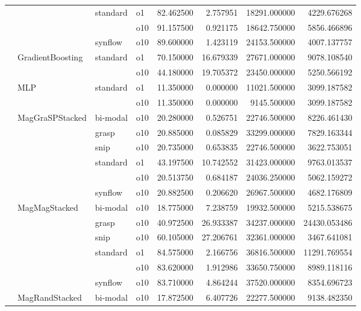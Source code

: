 \begin{longtable}{llllrrrr}
      &     & standard & o1 &  82.462500 &   2.757951 &     18291.000000 &   4229.676268 \\
      &     &         & o10 &  91.157500 &   0.921175 &     18642.750000 &   5856.466896 \\
      &     & synflow & o10 &  89.600000 &   1.423119 &     24153.500000 &   4007.137757 \\
      & GradientBoosting & standard & o1 &  70.150000 &  16.679339 &     27671.000000 &   9078.108540 \\
      &     &         & o10 &  44.180000 &  19.705372 &     23450.000000 &   5250.566192 \\
      & MLP & standard & o1 &  11.350000 &   0.000000 &     11021.500000 &   3099.187582 \\
      &     &         & o10 &  11.350000 &   0.000000 &      9145.500000 &   3099.187582 \\
      & MagGraSPStacked & bi-modal & o10 &  20.280000 &   0.526751 &     22746.500000 &   8226.461430 \\
      &     & grasp & o10 &  20.885000 &   0.085829 &     33299.000000 &   7829.163344 \\
      &     & snip & o10 &  20.735000 &   0.653835 &     22746.500000 &   3622.753051 \\
      &     & standard & o1 &  43.197500 &  10.742552 &     31423.000000 &   9763.013537 \\
      &     &         & o10 &  20.513750 &   0.684187 &     24036.250000 &   5062.159272 \\
      &     & synflow & o10 &  20.882500 &   0.206620 &     26967.500000 &   4682.176809 \\
      & MagMagStacked & bi-modal & o10 &  18.775000 &   7.238759 &     19932.500000 &   5215.538675 \\
      &     & grasp & o10 &  40.972500 &  26.933387 &     34237.000000 &  24430.053486 \\
      &     & snip & o10 &  60.105000 &  27.206761 &     32361.000000 &   3467.641081 \\
      &     & standard & o1 &  84.575000 &   2.166756 &     36816.500000 &  11291.769554 \\
      &     &         & o10 &  83.620000 &   1.912986 &     33650.750000 &   8989.118116 \\
      &     & synflow & o10 &  83.710000 &   4.864244 &     37520.000000 &   8354.696723 \\
      & MagRandStacked & bi-modal & o10 &  17.872500 &   6.407726 &     22277.500000 &   9138.482350 \\

\end{longtable}
